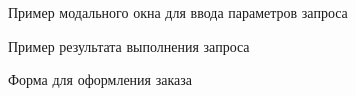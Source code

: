 \documentclass[a4paper]{article}
\begin{document}
				\begin{figure}[H]
					\centering
					\caption{Пример модального окна для ввода параметров запроса}
				\end{figure}
			
				\begin{figure}[H]
					\centering
					\caption{Пример результата выполнения запроса}
				\end{figure}
			
				\begin{figure}[H]
					\centering
					\caption{Форма для оформления заказа}
				\end{figure}
\end{document}
